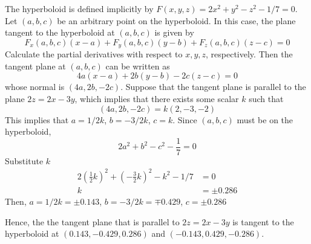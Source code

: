 \documentclass[11pt]{article}
\begin{document}
\begin{enumerate}
    The hyperboloid is defined implicitly by $F(x,y,z)=2x^2+y^2-z^2-1/7=0$. Let $(a,b,c)$ be an arbitrary point on the hyperboloid. In this case, the plane tangent to the hyperboloid at $(a,b,c)$ is given by
    $$
    F_x(a,b,c)(x-a) + F_y(a,b,c)(y-b) + F_z(a,b,c)(z-c) = 0
    $$
    Calculate the partial derivatives with respect to $x,y,z$, respectively. Then the tangent plane at $(a,b,c)$ can be written as
    $$
    4a(x-a) + 2b(y-b) - 2c(z-c) = 0
    $$
    whose normal is $(4a,2b,-2c)$. Suppose that the tangent plane is parallel to the plane $2z=2x-3y$, which implies that there exists some scalar $k$ such that
    $$
    (4a,2b,-2c) = k(2,-3,-2)
    $$
    This implies that $a=1/2k$, $b=-3/2k$, $c=k$. Since $(a,b,c)$ must be on the hyperboloid,
    $$
    2a^2 + b^2 - c^2 - \frac{1}{7} = 0
    $$
    Substitute $k$
    $$
    \begin{aligned}
        2\left(\frac{1}{2}k\right)^2 + \left(-\frac32k\right)^2 - k ^2 - 1/7 &= 0 \\
        k &= \pm 0.286
    \end{aligned}
    $$
    Then, $a=1/2k = \pm 0.143$, $b=-3/2k= \mp 0.429$, $c= \pm 0.286$
    
    Hence, the the tangent plane that is parallel to $2z=2x-3y$ is tangent to the hyperboloid at $(0.143,-0.429,0.286)$ and $(-0.143,0.429,-0.286)$.
    

\end{enumerate}
\end{document}
